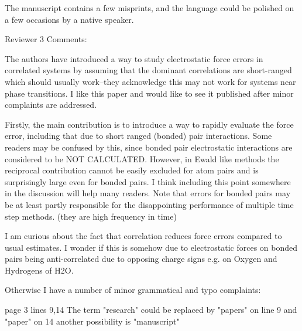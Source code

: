 \documentclass[a4paper]{article}
\begin{document}
The manuscript contains a few misprints, and the language could be polished on a few occasions by a native speaker.





Reviewer 3 Comments:

The authors have introduced a way to study electrostatic force errors in correlated systems by assuming that the dominant correlations are short-ranged which should usually work--they acknowledge this may not work for systems near phase transitions. I like this paper and would like to see it published after minor complaints are addressed.

Firstly, the main contribution is to introduce a way to rapidly evaluate the force error, including that due to short ranged (bonded) pair interactions. Some readers may be confused by this, since bonded pair electrostatic interactions are considered to be NOT CALCULATED. However, in Ewald like methods the reciprocal contribution cannot be easily excluded for atom pairs and is surprisingly large even for bonded pairs. I think including this point somewhere in the discussion will help many readers. Note that errors for bonded pairs may be at least partly responsible for the disappointing performance of multiple time step methods. (they are high frequency in time)

I am curious about the fact that correlation reduces force errors compared to usual estimates. I wonder if this is somehow due to electrostatic forces on bonded pairs being anti-correlated due to opposing charge signs e.g. on Oxygen and Hydrogens of H2O.

Otherwise I have a number of minor grammatical and typo complaints:

page 3 lines 9,14  The term "research" could be replaced by "papers" on line 9 and "paper" on 14
another possibility is "manuscript"
\end{document}
